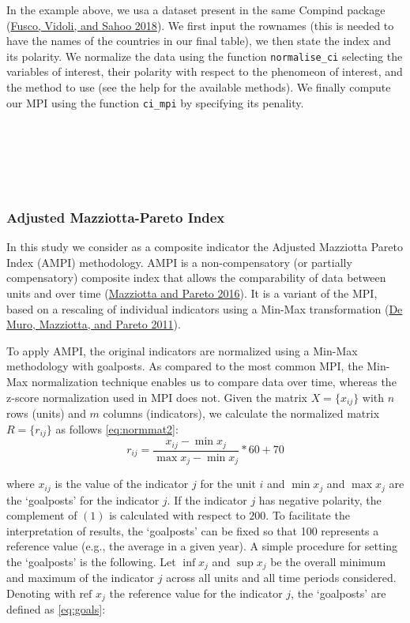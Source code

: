 \documentclass[
]{article}
\begin{document}
In the example above, we usa a dataset present in the same Compind
package (\protect\hyperlink{ref-compind}{Fusco, Vidoli, and Sahoo 2018}). We first input the rownames (this is needed to have
the names of the countries in our final table), we then state the index
and its polarity. We normalize the data using the function
\texttt{normalise\_ci} selecting the variables of interest, their polarity with
respect to the phenomeon of interest, and the method to use (see the
help for the available methods). We finally compute our MPI using the
function \texttt{ci\_mpi} by specifying its penality.

~

~

~

\hypertarget{adjusted-mazziotta-pareto-index}{%
\subsubsection{Adjusted Mazziotta-Pareto Index}\label{adjusted-mazziotta-pareto-index}}

In this study we consider as a composite indicator the Adjusted
Mazziotta Pareto Index (AMPI) methodology. AMPI is a non-compensatory
(or partially compensatory) composite index that allows the
comparability of data between units and over time
(\protect\hyperlink{ref-mazziotta2016generalized}{Mazziotta and Pareto 2016}). It is a variant of the MPI, based on a
rescaling of individual indicators using a Min-Max transformation
(\protect\hyperlink{ref-de2011composite}{De Muro, Mazziotta, and Pareto 2011}).

To apply AMPI, the original indicators are normalized using a Min-Max
methodology with goalposts. As compared to the most common MPI, the
Min-Max normalization technique enables us to compare data over time,
whereas the z-score normalization used in MPI does not. Given the matrix
\(X=\{x_{ij}\}\) with \(n\) rows (units) and \(m\) columns (indicators), we
calculate the normalized matrix \(R=\{r_{ij}\}\) as follows \eqref{eq:normmat2}:
\begin{equation}
r_{ij}=\frac{x_{ij} -\min x_j}{\max x_j - \min x_j} *60+70
\label{eq:normmat2}
\end{equation}

where \(x_{ij}\) is the value of the indicator \(j\) for the unit \(i\) and
\(\min x_j\) and \(\max x_j\) are the `goalposts' for the indicator \(j\). If
the indicator \(j\) has negative polarity, the complement of \((1)\) is
calculated with respect to \(200\). To facilitate the interpretation of
results, the `goalposts' can be fixed so that 100 represents a reference
value (e.g., the average in a given year). A simple procedure for
setting the `goalposts' is the following. Let \(\inf x_j\) and \(\sup x_j\)
be the overall minimum and maximum of the indicator \(j\) across all units
and all time periods considered. Denoting with \(\text{ref } x_j\) the
reference value for the indicator \(j\), the `goalposts' are defined as \eqref{eq:goals}:
\end{document}
